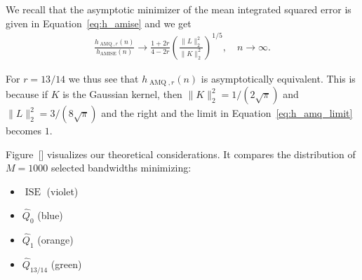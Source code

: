 We recall that the asymptotic minimizer of the mean integrated squared error is given in Equation~\eqref{eq:h_amise} and we get
\begin{align}\label{eq:h_amq_limit}
    \frac{h_{\operatorname{AMQ},r}(n)}{h_{\operatorname{AMISE}}(n)}\to\frac{1+2r}{4-2r}\left(\frac{\|L\|_2^2}{\|K\|_2^2}\right)^{1/5},\quad n\to\infty.
\end{align}

For $r=13/14$ we thus see that $h_{\operatorname{AMQ},r}(n)$ is asymptotically equivalent. This is because if $K$ is the Gaussian kernel, then $\|K\|_2^2=1/(2\sqrt{\pi})$ and $\|L\|_2^2=3/(8\sqrt{\pi})$ and the right and the limit in Equation~\eqref{eq:h_amq_limit} becomes $1$.

Figure~[] visualizes our theoretical considerations. It compares the distribution of $M=1000$ selected bandwidths minimizing:
\begin{itemize}
    \item $\operatorname{ISE}$ (violet)
    \item $\hat{Q}_0$ (blue)
    \item $\hat{Q}_1$ (orange)
    \item $\hat{Q}_{13/14}$ (green)
\end{itemize}
